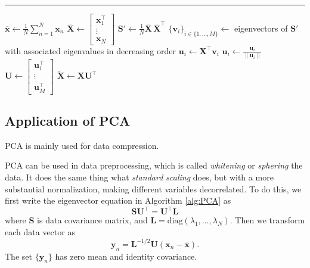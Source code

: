 \documentclass{article}
\begin{document}
        \begin{algorithm}[H]
            \DontPrintSemicolon

            \caption{Modified PCA}


            \BlankLine
            \hrule
            $\overline{\textbf{x}} \leftarrow \frac{1}{N}\sum_{n=1}^{N}\textbf{x}_n$\;
            $\overline{\textbf{X}} \leftarrow \begin{bmatrix} \textbf{x}_1^\top \\ \vdots \\ \textbf{x}_N \end{bmatrix}$\;
            $\textbf{S}' \leftarrow \frac{1}{N}\overline{\textbf{X}}\,\overline{\textbf{X}}^\top$\;
            $\{\textbf{v}_i\}_{i \in \{1,\dots,M\}} \leftarrow$ eigenvectors of $\textbf{S}'$ with associated eigenvalues in decreasing order\;
            $\textbf{u}_i \leftarrow \textbf{X}^\top\textbf{v}_i$\;
            $\textbf{u}_i \leftarrow \frac{\textbf{u}_i}{\|\textbf{u}_i\|}$\;
            $\textbf{U} \leftarrow \begin{bmatrix} \textbf{u}_1^\top \\ \vdots \\ \textbf{u}_M^\top \end{bmatrix}$\;
            \BlankLine
            $\tilde{\textbf{X}} \leftarrow \textbf{X}\textbf{U}^\top$\;
        \end{algorithm}
    
    \subsection{Application of PCA}
        PCA is mainly used for data compression.

        PCA can be used in data preprocessing, which is called \emph{whitening} or \emph{sphering} the data. It does the same thing what \emph{standard scaling} does,
        but with a more substantial normalization, making different variables decorrelated.
        To do this, we first write the eigenvector equation in Algorithm \ref{alg:PCA} as
        \[
        \textbf{S}\textbf{U}^\top=\textbf{U}^\top\textbf{L}
        \]
        where \textbf{S} is data covariance matrix, and $\textbf{L}=\text{diag}(\lambda_1,\dots,\lambda_N)$. Then we transform each data vector as
        \[
        \textbf{y}_n = \textbf{L}^{-1/2}\textbf{U}(\textbf{x}_n-\overline{\textbf{x}}).
        \]
        The set $\{\textbf{y}_n\}$ has zero mean and identity covariance. 
\end{document}
